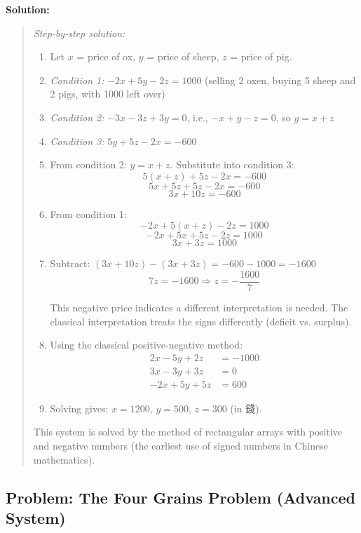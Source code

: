 \documentclass[11pt,a4paper]{article}
\newcommand{\zh}[1]{{#1}}
\newenvironment{chsolution}{%
  \par\medskip\noindent\textbf{\textcolor{notecolor}{Solution:}}\par\nopagebreak
  \begin{quote}\small
}{%
  \end{quote}\medskip
}
\newenvironment{stepbystep}{%
  \par\smallskip\noindent\textit{Step-by-step solution:}\par\nopagebreak
  \begin{enumerate}[leftmargin=2em,label=\textbf{Step \arabic*:},ref=\arabic*]
}{%
  \end{enumerate}\medskip
}
\begin{document}
\begin{chsolution}
\begin{stepbystep}
\item Let $x$ = price of ox, $y$ = price of sheep, $z$ = price of pig.

\item \textit{Condition 1:} $-2x + 5y - 2z = 1000$ (selling 2 oxen, buying 5
sheep and 2 pigs, with 1000 left over)

\item \textit{Condition 2:} $-3x - 3z + 3y = 0$, i.e., $-x + y - z = 0$, so $y = x + z$

\item \textit{Condition 3:} $5y + 5z - 2x = -600$

\item From condition 2: $y = x + z$. Substitute into condition 3:
\[
5(x+z) + 5z - 2x = -600
\]
\[
5x + 5z + 5z - 2x = -600
\]
\[
3x + 10z = -600
\]

\item From condition 1:
\[
-2x + 5(x+z) - 2z = 1000
\]
\[
-2x + 5x + 5z - 2z = 1000
\]
\[
3x + 3z = 1000
\]

\item Subtract: $(3x + 10z) - (3x + 3z) = -600 - 1000 = -1600$
\[
7z = -1600 \Rightarrow z = -\frac{1600}{7}
\]

This negative price indicates a different interpretation is needed. The
classical interpretation treats the signs differently (deficit vs. surplus).

\item Using the classical positive-negative method:
\begin{align*}
2x - 5y + 2z &= -1000 \\
3x - 3y + 3z &= 0 \\
-2x + 5y + 5z &= 600
\end{align*}

\item Solving gives: $x = 1200$, $y = 500$, $z = 300$ (in \zh{錢}).
\end{stepbystep}

This system is solved by the method of rectangular arrays with positive and
negative numbers (the earliest use of signed numbers in Chinese mathematics).
\end{chsolution}

\subsection{Problem: The Four Grains Problem (Advanced System)}
\end{document}

